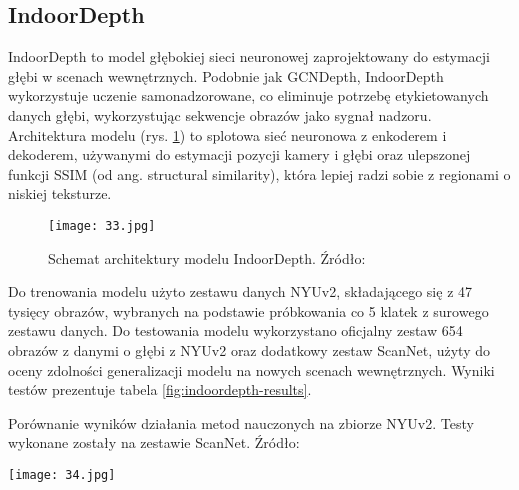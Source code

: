 \subsection{IndoorDepth}
IndoorDepth \cite{fan2023deeper} to model głębokiej sieci neuronowej zaprojektowany do estymacji głębi w scenach wewnętrznych. Podobnie jak GCNDepth, IndoorDepth wykorzystuje uczenie samonadzorowane, co eliminuje potrzebę etykietowanych danych głębi, wykorzystując sekwencje obrazów jako sygnał nadzoru. Architektura modelu (rys. \ref{fig:indoordepth-architecture}) to splotowa sieć neuronowa z enkoderem i dekoderem, używanymi do estymacji pozycji kamery i głębi oraz ulepszonej funkcji SSIM (od ang. structural similarity), która lepiej radzi sobie z regionami o niskiej teksturze.
\begin{figure}[H]
    \centering
    \texttt{[image: 33.jpg]}
    \caption{Schemat architektury modelu IndoorDepth. Źródło: \cite{fan2023deeper}}
    \label{fig:indoordepth-architecture}
\end{figure}
Do trenowania modelu użyto zestawu danych NYUv2, składającego się z 47 tysięcy obrazów, wybranych na podstawie próbkowania co 5 klatek z surowego zestawu danych. Do testowania modelu wykorzystano oficjalny zestaw 654 obrazów z danymi o głębi z NYUv2 oraz dodatkowy zestaw ScanNet, użyty do oceny zdolności generalizacji modelu na nowych scenach wewnętrznych. Wyniki testów prezentuje tabela \ref{fig:indoordepth-results}.
\begin{table}[H]
    \centering
    \caption{Porównanie wyników działania metod nauczonych na zbiorze NYUv2. Testy wykonane zostały na zestawie ScanNet. Źródło: \cite{fan2023deeper}}
    \texttt{[image: 34.jpg]}
    \label{fig:indoordepth-results}
\end{table}

